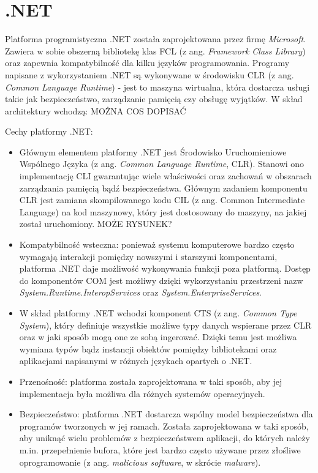 \section{.NET}
Platforma programistyczna .NET została zaprojektowana przez firmę \textit{Microsoft}. Zawiera w sobie obszerną bibliotekę klas FCL (z ang. \textit{Framework Class Library}) oraz zapewnia kompatybilność dla kilku języków programowania. Programy napisane z wykorzystaniem .NET są wykonywane w środowisku CLR (z ang. \textit{Common Language Runtime}) - jest to maszyna wirtualna, która dostarcza usługi takie jak bezpieczeństwo, zarządzanie pamięcią czy obsługę wyjątków. 
W skład architektury wchodzą: MOŻNA COS DOPISAĆ


Cechy platformy .NET:
\begin{itemize}
	\item Głównym elementem platformy .NET jest Środowisko Uruchomieniowe Wspólnego Języka (z ang. \textit{Common Language Runtime}, CLR). Stanowi ono implementację CLI gwarantując wiele właściwości oraz zachowań w obszarach zarządzania pamięcią bądź bezpieczeństwa. Głównym zadaniem komponentu CLR jest zamiana skompilowanego kodu CIL (z ang. Common Intermediate Language) na kod maszynowy, który jest dostosowany do maszyny, na jakiej został uruchomiony. MOŻE RYSUNEK?
	\item Kompatybilność wsteczna: ponieważ systemu komputerowe bardzo często wymagają interakcji pomiędzy nowszymi i starszymi komponentami, platforma .NET daje możliwość wykonywania funkcji poza platformą. Dostęp do komponentów COM jest możliwy dzięki wykorzystaniu przestrzeni nazw \textit{System.Runtime.InteropServices} oraz \textit{System.EnterpriseServices}.
	\item W skład platformy .NET wchodzi komponent CTS (z ang. \textit{Common Type System}), który definiuje wszystkie możliwe typy danych wspierane przez CLR oraz w jaki sposób mogą one ze sobą ingerować. Dzięki temu jest możliwa wymiana typów bądz instancji obiektów pomiędzy bibliotekami oraz aplikacjami napisanymi w różnych językach opartych o .NET.
	\item Przenośność: platforma została zaprojektowana w taki sposób, aby jej implementacja była możliwa dla różnych systemów operacyjnych.
	\item Bezpieczeństwo: platforma .NET dostarcza wspólny model bezpieczeństwa dla programów tworzonych w jej ramach. Została zaprojektowana w taki sposób, aby uniknąć wielu problemów z bezpieczeństwem aplikacji, do których należy m.in. przepełnienie bufora, które jest bardzo często używane przez złośliwe oprogramowanie (z ang. \textit{malicious software}, w skrócie \textit{malware}).
	
\end{itemize}

